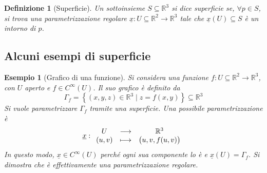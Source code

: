 \documentclass[12pt]{article}
\theoremstyle{style}
\newtheorem{esempio}{Esempio}[section]
\newtheorem{definizione}{Definizione}[section]
\numberwithin{equation}{subsection}
\begin{document}
\begin{definizione}
	[Superficie]
	Un sottoinsieme $S \subseteq \mathbb{R}^3$ si dice \textit{superficie} se, $\forall p \in S$, si trova una parametrizzazione regolare $\underline{x}:U\subseteq \mathbb{R}^2 \to \mathbb{R}^3$ tale che $\underline{x}(U) \subseteq S$ \`e un intorno di $p$.
\end{definizione}

\subsection{Alcuni esempi di superficie}
\begin{esempio}
	[Grafico di una funzione]
	Si considera una funzione $f:U \subseteq \mathbb{R}^2 \to \mathbb{R}^3$, con $U$ aperto e $f \in C^\infty(U)$.
	Il suo grafico \`e definito da
	\[
	\Gamma_f = \left\{ (x,y,z) \in \mathbb{R}^3  \mid z= f(x,y) \right\} \subseteq \mathbb{R}^3
	\] 
	Si vuole parametrizzare $\Gamma_f$ tramite una superficie.
	Una possibile parametrizzazione \`e 
	\[
		\underline{x}:
	\begin{array}
		{c c c}
		U & \longrightarrow & \mathbb{R}^3\\
		(u,v) &\longmapsto & \big(u,v,f(u,v)\big)
	\end{array}
	\] 
	In questo modo, $\underline{x} \in C^\infty(U)$ perch\'e ogni sua componente lo \`e e $\underline{x}(U) = \Gamma_f$.
	Si dimostra che \`e effettivamente una parametrizzazione regolare.
\end{esempio}
\end{document}
